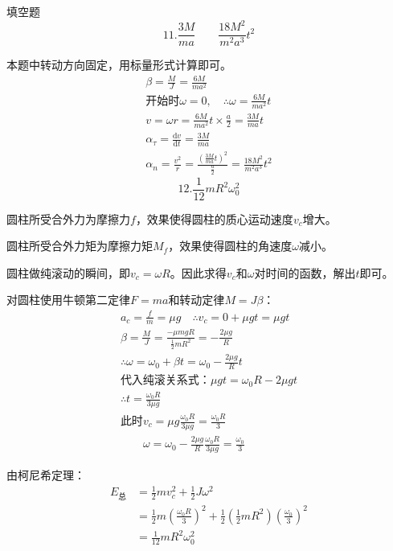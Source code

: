 \documentclass[a4paper,fleqn,twocolumn]{ctexart}
\newcommand{\di}[1]{\mathrm{d}#1}
\newcommand{\dy}[2]{\frac{\di{#1}}{\di{#2}}}
\begin{document}
	\begin{section}{填空题}
		\[11.\frac{3M}{ma} \hspace{2em} \frac{18M^2}{m^2a^3}t^2\]\par
		本题中转动方向固定，用标量形式计算即可。
		\begin{gather*}
			\beta=\frac{M}{J}=\frac{6M}{ma^2}\\
			\text{开始时}\omega=0,\quad\therefore \omega=\frac{6M}{ma^2}t\\
			v=\omega r=\frac{6M}{ma^2}t\times\frac{a}{2}=\frac{3M}{ma}t\\
			\alpha_{\tau}=\dy{v}{t}=\frac{3M}{ma}\\
			\alpha_n=\frac{v^2}{r}=\frac{\left(\frac{3M}{ma}t\right)^2}{\frac{a}{2}}=\frac{18M^2}{m^2a^3}t^2
		\end{gather*}
		\[12.\frac{1}{12}mR^2\omega_0^2\]\par
		圆柱所受合外力为摩擦力$f$，效果使得圆柱的质心运动速度$ v_c $增大。\par
		圆柱所受合外力矩为摩擦力矩$ M_f $，效果使得圆柱的角速度$ \omega $减小。\par
		圆柱做纯滚动的瞬间，即$ v_c=\omega R $。因此求得$ v_c $和$ \omega $对时间的函数，解出$ t $即可。\par
		对圆柱使用牛顿第二定律$F=ma$和转动定律$M=J\beta$：
		\begin{gather*}
			a_c=\frac{f}{m}=\mu g\quad\therefore v_c=0+\mu gt=\mu gt\\
			\beta=\frac{M}{J}=\frac{-\mu mgR}{\frac{1}{2}mR^2}=-\frac{2\mu g}{R}\\
			\therefore \omega=\omega_0+\beta t=\omega_0-\frac{2\mu g}{R}t\\
			\text{代入纯滚关系式：}\mu gt=\omega_0R-2\mu gt\\
			\therefore t=\frac{\omega_0R}{3\mu g}\\
			\text{此时}v_c=\mu g\frac{\omega_0R}{3\mu g}=\frac{\omega_0R}{3}\\
			\hspace{2em}\omega=\omega_0-\frac{2\mu g}{R}\frac{\omega_0R}{3\mu g}=\frac{\omega_0}{3}
		\end{gather*}\par
		由柯尼希定理：
		\begin{align*}
			E_{\text{总}}&=\frac{1}{2}mv_c^2+\frac{1}{2}J\omega^2\\
						&=\frac{1}{2}m\left(\frac{\omega_0R}{3}\right)^2+\frac{1}{2}\left(\frac{1}{2}mR^2\right)\left(\frac{\omega_0}{3}\right)^2\\
						&=\frac{1}{12}mR^2\omega_0^2

\end{align*}
\end{section}
\end{document}

